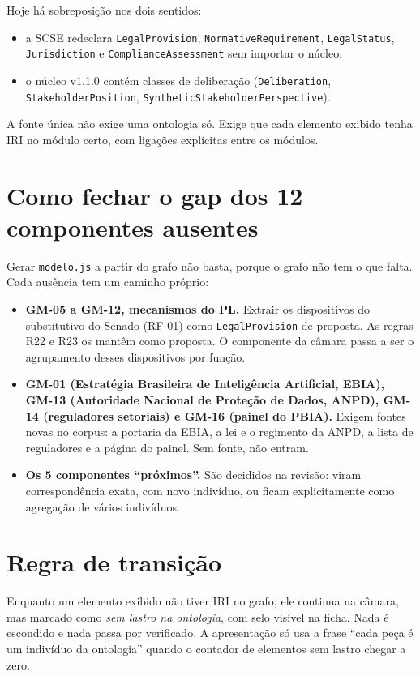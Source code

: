 \documentclass[12pt,a4paper,oneside,english,brazil]{abntex2}
\begin{document}
\noindent Hoje há sobreposição nos dois sentidos:
\begin{itemize}[leftmargin=*]
  \item a SCSE redeclara \texttt{LegalProvision}, \texttt{NormativeRequirement}, \texttt{LegalStatus}, \texttt{Jurisdiction} e \texttt{ComplianceAssessment} sem importar o núcleo;
  \item o núcleo v1.1.0 contém classes de deliberação (\texttt{Deliberation}, \texttt{StakeholderPosition}, \texttt{SyntheticStakeholderPerspective}).
\end{itemize}
A fonte única não exige uma ontologia só. Exige que cada elemento exibido tenha IRI no módulo certo, com ligações explícitas entre os módulos.

\section{Como fechar o gap dos 12 componentes ausentes}
Gerar \texttt{modelo.js} a partir do grafo não basta, porque o grafo não tem o que falta. Cada ausência tem um caminho próprio:
\begin{itemize}[leftmargin=*]
  \item \textbf{GM-05 a GM-12, mecanismos do PL.} Extrair os dispositivos do substitutivo do Senado (RF-01) como \texttt{LegalProvision} de proposta. As regras R22 e R23 os mantêm como proposta. O componente da câmara passa a ser o agrupamento desses dispositivos por função.
  \item \textbf{GM-01 (Estratégia Brasileira de Inteligência Artificial, EBIA), GM-13 (Autoridade Nacional de Proteção de Dados, ANPD), GM-14 (reguladores setoriais) e GM-16 (painel do PBIA).} Exigem fontes novas no corpus: a portaria da EBIA, a lei e o regimento da ANPD, a lista de reguladores e a página do painel. Sem fonte, não entram.
  \item \textbf{Os 5 componentes ``próximos''.} São decididos na revisão: viram correspondência exata, com novo indivíduo, ou ficam explicitamente como agregação de vários indivíduos.
\end{itemize}

\section{Regra de transição}
Enquanto um elemento exibido não tiver IRI no grafo, ele continua na câmara, mas marcado como \emph{sem lastro na ontologia}, com selo visível na ficha. Nada é escondido e nada passa por verificado. A apresentação só usa a frase ``cada peça é um indivíduo da ontologia'' quando o contador de elementos sem lastro chegar a zero.
\end{document}
